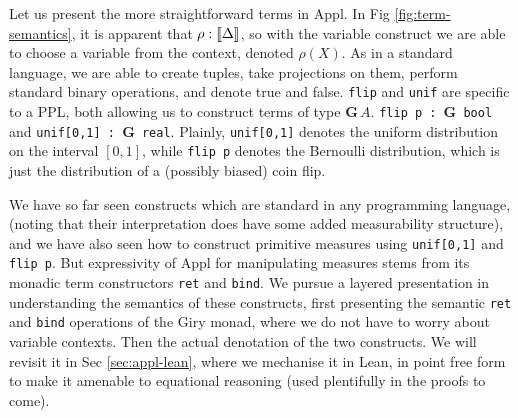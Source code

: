 Let us present the more straightforward terms in Appl. In Fig \ref{fig:term-semantics}, it is apparent that $\rho : \llbracket \Delta \rrbracket$, so with the variable construct we are
able to choose a variable from the context, denoted $\rho(X)$. As in a standard language, we are able to create tuples, take projections on them, perform standard binary operations, and denote true and false.
\texttt{flip} and \texttt{unif} are specific to a PPL, both allowing us to construct terms of type $\mathbf{G}\, A$. \texttt{flip p : $\mathbf{G}$ bool} and \texttt{unif[0,1] : $\mathbf{G}$ real}.
Plainly, \texttt{unif[0,1]} denotes the uniform distribution on the interval $[0,1]$, while \texttt{flip p} denotes the Bernoulli distribution, which is just the distribution of a (possibly biased) coin flip.

We have so far seen constructs which are standard in any programming language, (noting that their interpretation does have some added measurability structure), and we have also seen how to construct primitive
measures using \texttt{unif[0,1]} and \texttt{flip p}. But expressivity of Appl for manipulating measures stems from its monadic term constructors \texttt{ret} and \texttt{bind}. We pursue a layered presentation
in understanding the semantics of these constructs, first presenting the semantic \texttt{ret} and \texttt{bind} operations of the Giry monad, where we do not have to worry about variable contexts.
Then the actual denotation of the two constructs. We will revisit it in Sec \ref{sec:appl-lean}, where we mechanise it in Lean, in point free form to make it amenable to equational reasoning 
(used plentifully in the proofs to come).





